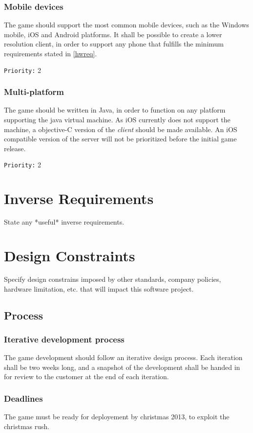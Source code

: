 \documentclass[a4paper,10pt]{article}
\newcommand{\prio}[1]{\texttt{Priority:} #1}
\begin{document}
\subsubsection{Mobile devices}
The game should support the most common mobile devices, such as the Windows mobile, iOS and Android platforms. It shall be possible to create a lower resolution client, in order to support any phone that fulfills the minimum requirements stated in \ref{hwreq}.

\prio{2}

\subsubsection{Multi-platform}
The game should be written in Java, in order to function on any platform supporting the java virtual machine. As iOS currently does not support the machine, a objective-C version of the \emph{client} should be made available. An iOS compatible version of the server will not be prioritized before the initial game release.

\prio{2}

\section{Inverse Requirements}
State any *useful* inverse requirements.

\section{Design Constraints}
Specify design constrains imposed by other standards, company policies, hardware limitation, etc. that will impact this software project.

\subsection{Process}
\subsubsection{Iterative development process}
The game development should follow an iterative design process. Each iteration shall be two weeks long, and a snapshot of the development shall be handed in for review to the customer at the end of each iteration.

\subsubsection{Deadlines}
The game must be ready for deployement by christmas 2013, to exploit the christmas rush.
\end{document}
